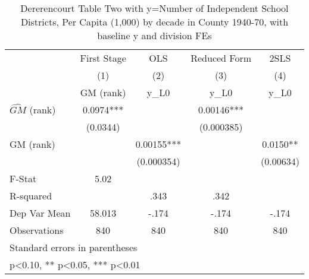 \begin{table}[htbp]\centering
\def\sym#1{\ifmmode^{#1}\else\(^{#1}\)\fi}
\caption{Dererencourt Table Two with y=Number of Independent School Districts, Per Capita (1,000) by decade in County 1940-70, with baseline y and division FEs}
\begin{tabular}{l*{4}{c}}
\toprule
                    & First Stage   &         OLS   &Reduced Form   &        2SLS   \\
                    &\multicolumn{1}{c}{(1)}&\multicolumn{1}{c}{(2)}&\multicolumn{1}{c}{(3)}&\multicolumn{1}{c}{(4)}\\
                    &\multicolumn{1}{c}{GM  (rank)}&\multicolumn{1}{c}{y\_L0}&\multicolumn{1}{c}{y\_L0}&\multicolumn{1}{c}{y\_L0}\\
\midrule
$\hat{GM}$ (rank)   &      0.0974***&               &     0.00146***&               \\
                    &    (0.0344)   &               &  (0.000385)   &               \\
\addlinespace
GM  (rank)          &               &     0.00155***&               &      0.0150** \\
                    &               &  (0.000354)   &               &   (0.00634)   \\
\midrule
F-Stat              &        5.02   &               &               &               \\
R-squared           &               &        .343   &        .342   &               \\
Dep Var Mean        &      58.013   &       -.174   &       -.174   &       -.174   \\
Observations        &         840   &         840   &         840   &         840   \\
\bottomrule
\multicolumn{5}{l}{\footnotesize Standard errors in parentheses}\\
\multicolumn{5}{l}{\footnotesize * p<0.10, ** p<0.05, *** p<0.01}\\
\end{tabular}
\end{table}
